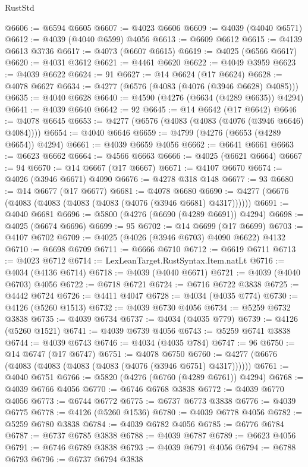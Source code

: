 \begin{lexlean}{RustStd}
\begin{coremodule}
@6606 := @6594 @6605
@6607 := @4023 @6606
@6609 := @4039 (@4040 @6571)
@6612 := @4039 (@4040 @6599) @4056
@6613 := @6609 @6612
@6615 := @4139 @6613 @3736
@6617 := @4073 (@6607 @6615)
@6619 := @4025 (@6566 @6617)
@6620 := @4031 @3612
@6621 := @4461 @6620
@6622 := @4049 @3959
@6623 := @4039 @6622
@6624 := 91
@6627 := @14 @6624 (@17 @6624)
@6628 := @4078 @6627
@6634 := @4277 (@6576 (@4083 (@4076 (@3946 @6628) @4085)))
@6635 := @4040 @6628
@6640 := @4590 (@4276 (@6634 (@4289 @6635)) @4294)
@6641 := @4039 @6640
@6642 := 92
@6645 := @14 @6642 (@17 @6642)
@6646 := @4078 @6645
@6653 := @4277 (@6576 (@4083 (@4083 (@4076 (@3946 @6646) @4084))))
@6654 := @4040 @6646
@6659 := @4799 (@4276 (@6653 (@4289 @6654)) @4294)
@6661 := @4039 @6659 @4056
@6662 := @6641 @6661
@6663 := @6623 @6662
@6664 := @4566 @6663
@6666 := @4025 (@6621 @6664)
@6667 := 94
@6670 := @14 @6667 (@17 @6667)
@6671 := @4107 @6670
@6674 := @4026 (@3946 @6671) @4090
@6676 := @4278 @318 @148
@6677 := 93
@6680 := @14 @6677 (@17 @6677)
@6681 := @4078 @6680
@6690 := @4277 (@6676 (@4083 (@4083 (@4083 (@4083 (@4076 (@3946 @6681) @4317))))))
@6691 := @4040 @6681
@6696 := @5800 (@4276 (@6690 (@4289 @6691)) @4294)
@6698 := @4025 (@6674 @6696)
@6699 := 95
@6702 := @14 @6699 (@17 @6699)
@6703 := @4107 @6702
@6709 := @4025 (@4026 (@3946 @6703) @4090 @6622) @4132
@6710 := @6698 @6709
@6711 := @6666 @6710
@6712 := @6619 @6711
@6713 := @4023 @6712
@6714 := LexLeanTarget.RustSyntax.Item.natLt
@6716 := @4034 (@4136 @6714)
@6718 := @4039 (@4040 @6671)
@6721 := @4039 (@4040 @6703) @4056
@6722 := @6718 @6721
@6724 := @6716 @6722 @3838
@6725 := @4442 @6724
@6726 := @4411 @4047
@6728 := @4034 (@4035 @774)
@6730 := @4126 (@5260 @1513)
@6732 := @4039 @6730 @4056
@6734 := @5259 @6732 @3838
@6735 := @4039 @6734
@6737 := @4034 (@4035 @779)
@6739 := @4126 (@5260 @1521)
@6741 := @4039 @6739 @4056
@6743 := @5259 @6741 @3838
@6744 := @4039 @6743
@6746 := @4034 (@4035 @784)
@6747 := 96
@6750 := @14 @6747 (@17 @6747)
@6751 := @4078 @6750
@6760 := @4277 (@6676 (@4083 (@4083 (@4083 (@4083 (@4076 (@3946 @6751) @4317))))))
@6761 := @4040 @6751
@6766 := @5820 (@4276 (@6760 (@4289 @6761)) @4294)
@6768 := @4039 @6766 @4056
@6770 := @6746 @6768 @3838
@6772 := @4039 @6770 @4056
@6773 := @6744 @6772
@6775 := @6737 @6773 @3838
@6776 := @4039 @6775
@6778 := @4126 (@5260 @1536)
@6780 := @4039 @6778 @4056
@6782 := @5259 @6780 @3838
@6784 := @4039 @6782 @4056
@6785 := @6776 @6784
@6787 := @6737 @6785 @3838
@6788 := @4039 @6787
@6789 := @6623 @4056
@6791 := @6746 @6789 @3838
@6793 := @4039 @6791 @4056
@6794 := @6788 @6793
@6796 := @6737 @6794 @3838

\end{coremodule}
\end{lexlean}
